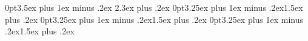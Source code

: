     \titlespacing*{\section}      {0pt}{3.5ex plus 1ex minus .2ex} {2.3ex plus .2ex}
    \titlespacing*{\subsection}   {0pt}{3.25ex plus 1ex minus .2ex}{1.5ex plus .2ex}
    \titlespacing*{\paragraph}    {0pt}{3.25ex plus 1ex minus .2ex}{1.5ex plus .2ex}
    \titlespacing*{\subparagraph} {0pt}{3.25ex plus 1ex minus .2ex}{1.5ex plus .2ex}


\linespread{1.1}
 \addtolength{\hoffset}{-0.0cm}
 \setlength{\topmargin}{-0.in}
 \setlength{\textheight}{8.25in}
\setlength{\footskip}{1.5cm} %
\setlength{\textwidth}{6.25in}
\setlength{\evensidemargin}{1in}
\setlength{\oddsidemargin}{0in}

\setlength\parindent{0pt}
\setlength{\parskip}{0.3cm}

\def\tcr{\textcolor{red}}
\def\tcb{\textcolor{blue}}
\def\accent{\it}
\def\vs{\vspace{0.5cm}}
\def\hs{\hspace{0.5cm}}
